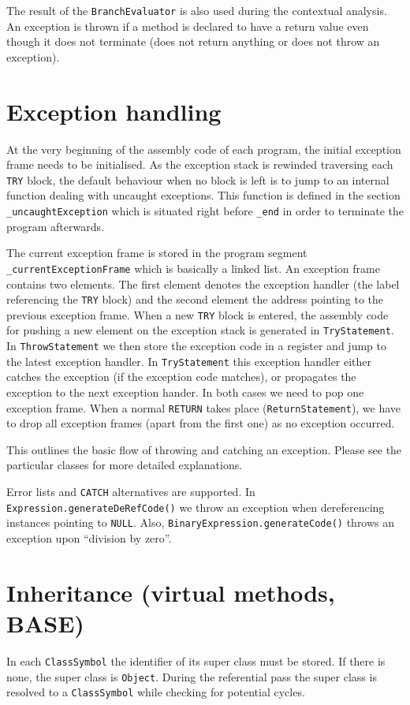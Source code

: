 \documentclass{guide}
\begin{document}
	The result of the \texttt{BranchEvaluator} is also used during the contextual
	analysis. An exception is thrown if a method is declared to have a return value
	even though it does not terminate (does not return anything or does not throw
	an exception).

	\section{Exception handling}
	At the very beginning of the assembly code of each program, the initial
	exception frame needs to be initialised. As the exception stack is rewinded
	traversing each \texttt{TRY} block, the default behaviour when no block is left is to jump
	to an internal function dealing with uncaught exceptions. This function is defined in the
	section \texttt{\_uncaughtException} which is situated right before
	\texttt{\_end} in order to terminate the program afterwards.

	The current exception frame is stored in
	the program segment \texttt{\_currentExceptionFrame} which is basically a linked
	list. An exception frame contains two elements. The first element denotes the
	exception handler (the label referencing the \texttt{TRY} block) and the second element
	the address pointing to the previous exception frame. When a new \texttt{TRY} block is
	entered, the 
	assembly code for pushing a new element on the exception stack is generated in \texttt{TryStatement}. In \texttt{ThrowStatement}
	we then store the exception code in a register and jump to the latest exception
	handler. In \texttt{TryStatement} this exception handler either catches the
	exception (if the exception code matches), or propagates the exception to the
	next exception hander. In both cases we need to pop one exception frame. When a
	normal \texttt{RETURN} takes place (\texttt{ReturnStatement}), we have to drop all
	exception frames (apart from the first one) as no exception occurred.

	This outlines the basic flow of throwing and catching an exception. Please see
	the particular classes for more detailed explanations.

	Error lists and \texttt{CATCH} alternatives are supported. In
	\texttt{Expression.generateDeRefCode()} we throw an exception when dereferencing
	instances pointing to \texttt{NULL}. Also, \texttt{BinaryExpression.generateCode()} throws an
	exception upon ``division by zero''.

	\section{Inheritance (virtual methods, BASE)}
	In each \texttt{ClassSymbol} the identifier of its super class must be stored.
	If there is none, the super class is \texttt{Object}. During the referential
	pass the super class is resolved to a \texttt{ClassSymbol} while checking
	for potential cycles.
\end{document}
